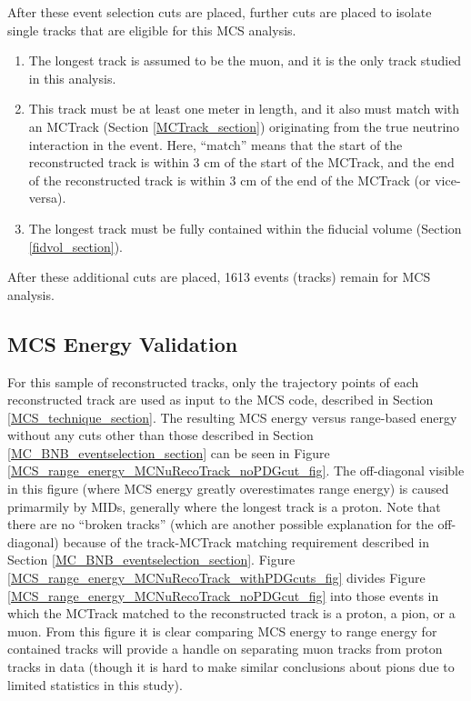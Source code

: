After these event selection cuts are placed, further cuts are placed to isolate single tracks that are eligible for this MCS analysis. 
\begin{enumerate}
\item The longest track is assumed to be the muon, and it is the only track studied in this analysis. 
\item This track must be at least one meter in length, and it also must match with an {\sc MCTrack} (Section \ref{MCTrack_section}) originating from the true neutrino interaction in the event. Here, ``match'' means that the start of the reconstructed track is within 3 cm of the start of the {\sc MCTrack}, and the end of the reconstructed track is within 3 cm of the end of the {\sc MCTrack} (or vice-versa).
\item The longest track must be fully contained within the fiducial volume (Section \ref{fidvol_section}).
\end{enumerate}

After these additional cuts are placed, 1613 events (tracks) remain for MCS analysis.

\subsection{MCS Energy Validation}\label{MCS_Energy_Validation_MCNuRecoTrack_section}
For this sample of reconstructed tracks, only the trajectory points of each reconstructed track are used as input to the MCS code, described in Section \ref{MCS_technique_section}. The resulting MCS energy versus range-based energy without any cuts other than those described in Section \ref{MC_BNB_eventselection_section} can be seen in Figure \ref{MCS_range_energy_MCNuRecoTrack_noPDGcut_fig}. The off-diagonal visible in this figure (where MCS energy greatly overestimates range energy) is caused primarmily by MIDs, generally where the longest track is a proton. Note that there are no ``broken tracks'' (which are another possible explanation for the off-diagonal) because of the track-{\sc MCTrack} matching requirement described in Section \ref{MC_BNB_eventselection_section}. Figure \ref{MCS_range_energy_MCNuRecoTrack_withPDGcuts_fig} divides Figure \ref{MCS_range_energy_MCNuRecoTrack_noPDGcut_fig} into those events in which the MCTrack matched to the reconstructed track is a proton, a pion, or a muon. From this figure it is clear comparing MCS energy to range energy for contained tracks will provide a handle on separating muon tracks from proton tracks in data (though it is hard to make similar conclusions about pions due to limited statistics in this study).\\

